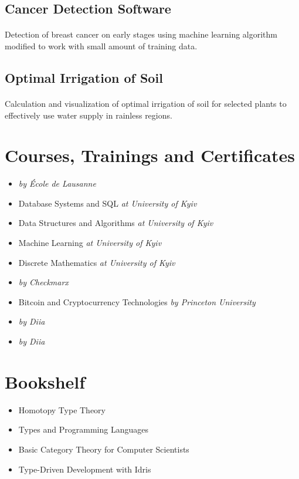 \subsection{Cancer Detection Software}
\paragraph{}
Detection of breast cancer on early stages using machine learning algorithm modified to work with small amount of training data.

\subsection{Optimal Irrigation of Soil}
\paragraph{}
Calculation and visualization of optimal irrigation of soil for selected plants to effectively use water supply in rainless regions.

\section{Courses, Trainings and Certificates}
\begin{itemize}
  \item {} \textit{by École de Lausanne}
  \item Database Systems and SQL \textit{at University of Kyiv}
  \item Data Structures and Algorithms \textit{at University of Kyiv}
  \item Machine Learning \textit{at University of Kyiv}
  \item Discrete Mathematics \textit{at University of Kyiv}
  \item {} \textit{by Checkmarx}
  \item Bitcoin and Cryptocurrency Technologies \textit{by Princeton University}
  \item {} \textit{by Diia}
  \item {} \textit{by Diia}
\end{itemize}

\section{Bookshelf}
\begin{itemize}
  \item Homotopy Type Theory
  \item Types and Programming Languages
  \item Basic Category Theory for Computer Scientists
  \item Type-Driven Development with Idris
\end{itemize}

